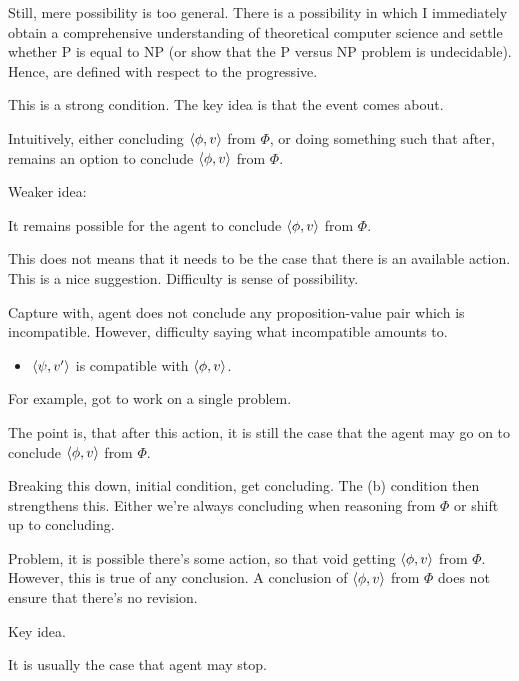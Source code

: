 \begin{note}
  Still, mere possibility is too general.
  There is a possibility in which I immediately obtain a comprehensive understanding of theoretical computer science and settle whether P is equal to NP (or show that the P versus NP problem is undecidable).
  Hence,  are defined with respect to the progressive.
\end{note}

\begin{note}

  This is a strong condition.
  The key idea is that the event comes about.

  Intuitively, either concluding \(\langle \phi, v \rangle\) from \(\Phi\), or doing something such that after, remains an option to conclude \(\langle \phi, v \rangle\) from \(\Phi\).

  Weaker idea:

  It remains possible for the agent to conclude \(\langle \phi, v \rangle\) from \(\Phi\).

  This does not means that it needs to be the case that there is an available action.
  This is a nice suggestion.
  Difficulty is sense of possibility.

  Capture with, agent does not conclude any proposition-value pair which is incompatible.
  However, difficulty saying what incompatible amounts to.

  \begin{itemize}
    \item
      \(\langle \psi, v' \rangle\) is compatible with \(\langle \phi, v \rangle\).
  \end{itemize}

  For example, got to work on a single problem.

  The point is, that after this action, it is still the case that the agent may go on to conclude \(\langle \phi, v \rangle\) from \(\Phi\).

  Breaking this down, initial condition, get concluding.
  The (b) condition then strengthens this.
  Either we're always concluding when reasoning from \(\Phi\) or shift up to concluding.

  Problem, it is possible there's some action, so that void getting \(\langle \phi, v \rangle\) from \(\Phi\).
  However, this is true of any conclusion.
  A conclusion of \(\langle \phi, v \rangle\) from \(\Phi\) does not ensure that there's no revision.
\end{note}

\begin{note}
  Key idea.

  It is usually the case that agent may stop.
\end{note}

